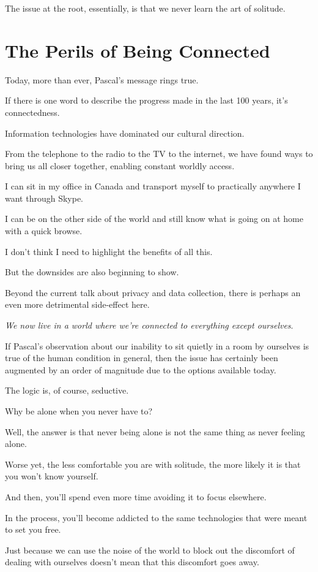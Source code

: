 \documentclass{book}
\numberwithin{equation}{section}
\begin{document}
%
The issue at the root, essentially, is that we never learn the art of solitude.

\section{The Perils of Being Connected}
Today, more than ever, Pascal's message rings true.

If there is one word to describe the progress made in the last 100 years, it's connectedness.

%
Information technologies have dominated our cultural direction.

From the telephone to the radio to the TV to the internet, we have found ways to bring us all closer together, enabling constant worldly access.

%
I can sit in my office in Canada and transport myself to practically anywhere I want through Skype.

I can be on the other side of the world and still know what is going on at home with a quick browse.

%
I don't think I need to highlight the benefits of all this.

But the downsides are also beginning to show.

Beyond the current talk about privacy and data collection, there is perhaps an even more detrimental side-effect here.

%
\textit{We now live in a world where we're connected to everything except ourselves}.

%
If Pascal's observation about our inability to sit quietly in a room by ourselves is true of the human condition in general, then the issue has certainly been augmented by an order of magnitude due to the options available today.

%
The logic is, of course, seductive.

Why be alone when you never have to?

%
Well, the answer is that never being alone is not the same thing as never feeling alone.

Worse yet, the less comfortable you are with solitude, the more likely it is that you won't know yourself.

And then, you'll spend even more time avoiding it to focus elsewhere.

In the process, you'll become addicted to the same technologies that were meant to set you free.

%
Just because we can use the noise of the world to block out the discomfort of dealing with ourselves doesn't mean that this discomfort goes away.
\end{document}
